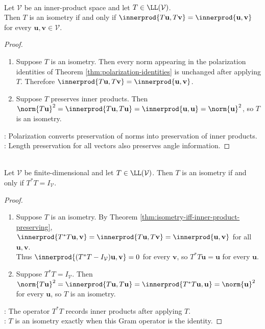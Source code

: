 \begin{theorem} \label{thm:isometry-iff-inner-product-preserving} \\
Let $\mathcal{V}$ be an inner-product space and let $T\in\LL(\mathcal{V})$.\\
Then $T$ is an isometry if and only if $\innerprod{T\mathbf{u},T\mathbf{v}}=\innerprod{\mathbf{u},\mathbf{v}}$ for every $\mathbf{u},\mathbf{v}\in\mathcal{V}$.
\begin{proof}
\begin{enumerate}[label=\roman*.]
\setlength{\itemsep}{0pt}
\item[$(\Rightarrow)$] Suppose $T$ is an isometry. Then every norm appearing in the polarization identities of Theorem \ref{thm:polarization-identities} is unchanged after applying $T$. Therefore $\innerprod{T\mathbf{u},T\mathbf{v}}=\innerprod{\mathbf{u},\mathbf{v}}$.
\item[$(\Leftarrow)$] Suppose $T$ preserves inner products. Then $\norm{T\mathbf{u}}^2=\innerprod{T\mathbf{u},T\mathbf{u}}=\innerprod{\mathbf{u},\mathbf{u}}=\norm{\mathbf{u}}^2$, so $T$ is an isometry.
\end{enumerate}
: Polarization converts preservation of norms into preservation of inner products.\\
: Length preservation for all vectors also preserves angle information.
\end{proof}
\end{theorem}

\begin{theorem} \label{thm:finite-dimensional-isometry-iff-adjoint-product-identity} \\
Let $\mathcal{V}$ be finite-dimensional and let $T\in\LL(\mathcal{V})$. Then $T$ is an isometry if and only if $T^*T=I_{\mathcal{V}}$.
\begin{proof}
\begin{enumerate}[label=\roman*.]
\setlength{\itemsep}{0pt}
\item[$(\Rightarrow)$] Suppose $T$ is an isometry. By Theorem \ref{thm:isometry-iff-inner-product-preserving}, $\innerprod{T^*T\mathbf{u},\mathbf{v}}=\innerprod{T\mathbf{u},T\mathbf{v}}=\innerprod{\mathbf{u},\mathbf{v}}$ for all $\mathbf{u},\mathbf{v}$.\\
Thus $\innerprod{(T^*T-I_{\mathcal{V}})\mathbf{u},\mathbf{v}}=0$ for every $\mathbf{v}$, so $T^*T\mathbf{u}=\mathbf{u}$ for every $\mathbf{u}$.
\item[$(\Leftarrow)$] Suppose $T^*T=I_{\mathcal{V}}$. Then $\norm{T\mathbf{u}}^2 =\innerprod{T\mathbf{u},T\mathbf{u}} =\innerprod{T^*T\mathbf{u},\mathbf{u}} =\norm{\mathbf{u}}^2$ for every $\mathbf{u}$, so $T$ is an isometry.
\end{enumerate}
: The operator $T^*T$ records inner products after applying $T$.\\
: $T$ is an isometry exactly when this Gram operator is the identity.
\end{proof}
\end{theorem}

